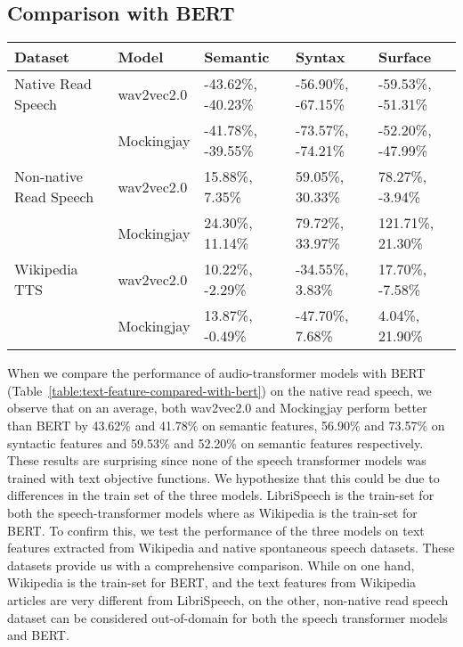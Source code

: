 \documentclass[sigconf]{acmart}
\begin{document}
\subsection{Comparison with BERT} 
\begin{table*}[!htbp]
\small
\centering
\begin{tabular}{|l|l|l|l|l|}
\hline
\textbf{Dataset} & \textbf{Model} & \textbf{Semantic} & \textbf{Syntax} & \textbf{Surface}   \\\hline
Native Read Speech & wav2vec2.0 &  -43.62\%, -40.23\% & -56.90\%, -67.15\% & -59.53\%, -51.31\%\\
& Mockingjay & -41.78\%, -39.55\% & -73.57\%, -74.21\%  & -52.20\%, -47.99\%\\ \hline
Non-native Read Speech & wav2vec2.0 & 15.88\%, 7.35\% & 59.05\%, 30.33\% & 78.27\%, -3.94\%\\
& Mockingjay & 24.30\%, 11.14\% & 79.72\%, 33.97\% & 121.71\%, 21.30\% \\ \hline
Wikipedia TTS & wav2vec2.0 & 10.22\%, -2.29\%& -34.55\%, 3.83\% & 17.70\%, -7.58\%\\ 
& Mockingjay  & 13.87\%, -0.49\% & -47.70\%, 7.68\% & 4.04\%, 21.90\% \\ \hline
\end{tabular}
\vspace{1 mm}
\caption{\label{table:text-feature-compared-with-bert} \small Table for comparison of the performance of BERT with wav2vec2.0 and Mockingjay on text features. The two values mentioned per cell indicate the relative minimum loss across all the model layers and the relative end layer losses when compared with the corresponding values for BERT. The values shown are an average across all features of a particular category with the relative performance calculated as $(model\_loss - bert\_loss)*100\%/bert\_loss$. %
}
\vspace{-4 mm}
\end{table*}

When we compare the performance of audio-transformer models with BERT (Table~\ref{table:text-feature-compared-with-bert}) on the native read speech, we observe that on an average, both wav2vec2.0 and Mockingjay perform better than BERT by 43.62\% and 41.78\% on semantic features, 56.90\% and 73.57\% on syntactic features and 59.53\% and 52.20\% on semantic features respectively. These results are surprising since none of the speech transformer models was trained with text objective functions. We hypothesize that this could be due to differences in the train set of the three models. LibriSpeech is the train-set for both the speech-transformer models where as Wikipedia is the train-set for BERT. To confirm this, we test the performance of the three models on text features extracted from Wikipedia and native spontaneous speech datasets. These datasets provide us with a comprehensive comparison. While on one hand, Wikipedia is the train-set for BERT, and the text features from Wikipedia articles are very different from LibriSpeech, on the other, non-native read speech dataset can be considered out-of-domain for both the speech transformer models and BERT.
\end{document}

